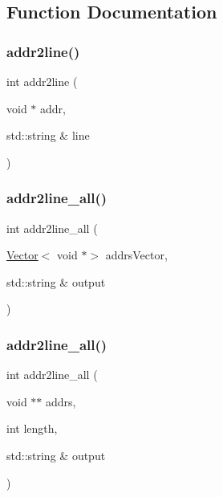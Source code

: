 \subsection{Function Documentation}
\mbox{\label{namespacestacktrace_a8ebfe19f3a27f6414cfce5805074fe42}} 
\subsubsection{\texorpdfstring{addr2line()}{addr2line()}}
{\footnotesize\ttfamily int addr2line (\begin{DoxyParamCaption}\item[{void $\ast$}]{addr,  }\item[{std\+::string \&}]{line }\end{DoxyParamCaption})}

\mbox{\label{namespacestacktrace_a9fe14c0a8fbf0b46e99d77f9160bc200}} 
\subsubsection{\texorpdfstring{addr2line\+\_\+all()}{addr2line\_all()}\hspace{0.1cm}{\footnotesize\ttfamily [1/2]}}
{\footnotesize\ttfamily int addr2line\+\_\+all (\begin{DoxyParamCaption}\item[{\mbox{\hyperlink{classVector}{Vector}}$<$ void $\ast$$>$}]{addrs\+Vector,  }\item[{std\+::string \&}]{output }\end{DoxyParamCaption})}

\mbox{\label{namespacestacktrace_a179c9d83db84c7fa809a4ab21d580d4b}} 
\subsubsection{\texorpdfstring{addr2line\+\_\+all()}{addr2line\_all()}\hspace{0.1cm}{\footnotesize\ttfamily [2/2]}}
{\footnotesize\ttfamily int addr2line\+\_\+all (\begin{DoxyParamCaption}\item[{void $\ast$$\ast$}]{addrs,  }\item[{int}]{length,  }\item[{std\+::string \&}]{output }\end{DoxyParamCaption})}

